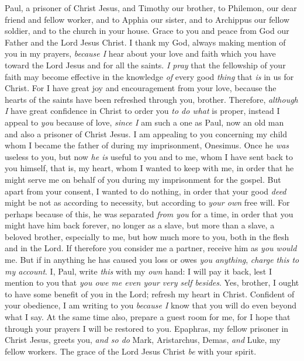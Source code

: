 
\begin{biblechapter} %
 Paul, a prisoner of Christ Jesus, and Timothy our brother, to Philemon, our dear friend and fellow worker,
\verse and to Apphia our sister, and to Archippus our fellow soldier, and to the church in your house.
\verse Grace to you and peace from God our Father and the Lord Jesus Christ.
 I thank my God, always making mention of you in my prayers,
\verse \textit{because I} hear about your love and faith which you have toward the Lord Jesus and for all the saints.
\verse \textit{I pray} that the fellowship of your faith may become effective in the knowledge \textit{of} every good \textit{thing} that \textit{is} in us for Christ.
\verse For I have great joy and encouragement from your love, because the hearts of the saints have been refreshed through you, brother.
 Therefore, \textit{although I} have great confidence in Christ to order you \textit{to do what} is proper,
\verse instead I appeal to \textit{you} because of love, \textit{since I} am such a one as Paul, now an old man and also a prisoner of Christ Jesus.
\verse I am appealing to you concerning my child whom I became the father of during my imprisonment, Onesimus.
\verse Once he \textit{was} useless to you, but now \textit{he is} useful to you and to me,
\verse whom I have sent back to you himself, that is, my heart,
\verse whom I wanted to keep with me, in order that he might serve me on behalf of you during my imprisonment for the gospel.
\verse But apart from your consent, I wanted to do nothing, in order that your good \textit{deed} might be not as according to necessity, but according to \textit{your own} free will.
\verse For perhaps because of this, he was separated \textit{from you} for a time, in order that you might have him back forever,
\verse no longer as a slave, but more than a slave, a beloved brother, especially to me, but how much more to you, both in the flesh and in the Lord.
 If therefore you consider me a partner, receive him as \textit{you would} me.
\verse But if in anything he has caused you loss or owes \textit{you anything}, \textit{charge this to my account}.
\verse I, Paul, write \textit{this} with my \textit{own} hand: I will pay it back, lest I mention to you that \textit{you owe me even your very self besides}.
\verse Yes, brother, I ought to have some benefit of you in the Lord; refresh my heart in Christ.
\verse Confident of your obedience, I am writing to you \textit{because I} know that you will do even beyond what I say.
\verse At the same time also, prepare a guest room for me, for I hope that through your prayers I will be restored to you.
 Epaphras, my fellow prisoner in Christ Jesus, greets you,
\verse \textit{and so do} Mark, Aristarchus, Demas, \textit{and} Luke, my fellow workers.
\verse The grace of the Lord Jesus Christ \textit{be} with your spirit.
\end{biblechapter}

